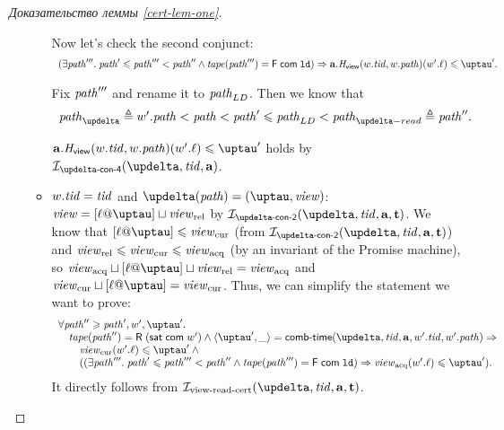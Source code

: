 \begin{proof}[Доказательство леммы \ref{cert-lem-one}]
\begin{itemize}
\begin{itemize}
      Now let's check the second conjunct:
      \[\begin{array}{l}
        (\exists \cpath'''. \; \cpath' \le \cpath''' < \cpath'' \land 
             \tape(\cpath''') = \tapeFence{\Committed}{\LD}) \Rightarrow \aT.\rmap(\w.\tId, \w.\cpath)(\w'.\loc) \le \tau'. \\
      \end{array}\]
      
      Fix $\mathit{path}'''$ and rename it to $\mathit{path}_{LD}$.
      Then we know that
      \[\begin{array}{l}
      \cpath_{\delta} \triangleq \w'.\cpath < \cpath < \cpath' \le \cpath_{LD} < \cpath_{\delta-read} \triangleq \cpath''.
      \end{array}\]

      $\aT.\rmap(\w.\tId, \w.\cpath)(\w'.\loc) \le \tau'$ holds by $\invDeltaDefFour(\delta, \tId, \aT)$.

        \item $w.\mathit{tid} = \mathit{tid}$ and $\delta(\cpath) = (\tau, \R)$: \\
          $\R = [\loc @ \tau] \sqcup \Rrel$ by $\invDeltaDefTwo(\delta, \tId, \aT, \tT)$.
          We know that $[\loc @ \tau] \le \Rcur$ (from $\invDeltaDefTwo(\delta, \tId, \aT, \tT)$) and $\mathit{view}_{\mathrm{rel}} \leqslant \mathit{view}_{\mathrm{cur}} \leqslant \mathit{view}_{\mathrm{acq}}$
          (by an invariant of the Promise machine), so $\Racq \sqcup [\loc @ \tau] \sqcup \Rrel = \Racq$ and
          $\Rcur \sqcup [\loc @ \tau] = \Rcur$.
          Thus, we can simplify the statement we want to prove:
      \[\begin{array}{l}
  \forall \cpath'' \ge \cpath', \w', \tau'. \\
\quad \tape(\cpath'') = \tapeRead{(\tapeSatisfied{\Committed}{\w'})} \land
   \angled{\tau', \_} = \deltaHmap(\delta, \tId, \aT, \w'.\tId, \w'.\cpath) \Rightarrow \\
\quad \quad \Rcur(\w'.\loc) \le \tau' \land {} \\
\quad \quad ((\exists \cpath'''. \; \cpath' \le \cpath''' < \cpath'' \land 
             \tape(\cpath''') = \tapeFence{\Committed}{\LD}) \Rightarrow \Racq(\w'.\loc) \le \tau'). \\
      \end{array}\]
      It directly follows from $\invViewReadCERT(\delta, \tId, \aT, \tT)$.
      \end{itemize}


\end{itemize}
\end{proof}
